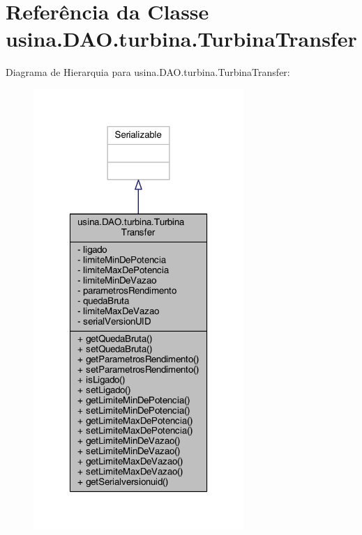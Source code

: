 \hypertarget{classusina_1_1_d_a_o_1_1turbina_1_1_turbina_transfer}{\section{Referência da Classe usina.\-D\-A\-O.\-turbina.\-Turbina\-Transfer}
\label{classusina_1_1_d_a_o_1_1turbina_1_1_turbina_transfer}
}


Diagrama de Hierarquia para usina.\-D\-A\-O.\-turbina.\-Turbina\-Transfer\-:\nopagebreak
\begin{figure}[H]
\begin{center}
\leavevmode
\includegraphics[width=226pt]{classusina_1_1_d_a_o_1_1turbina_1_1_turbina_transfer__inherit__graph}
\end{center}
\end{figure}


